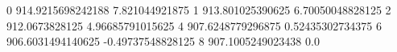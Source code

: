 0 914.9215698242188 7.821044921875
1 913.801025390625 6.70050048828125
2 912.0673828125 4.96685791015625
4 907.6248779296875 0.52435302734375
6 906.6031494140625 -0.49737548828125
8 907.1005249023438 0.0

